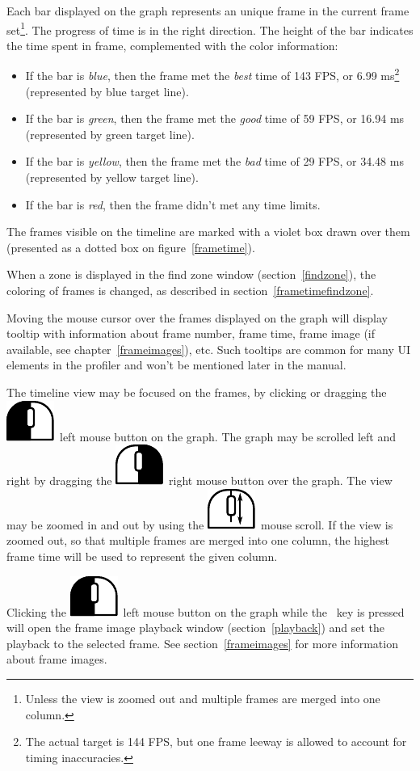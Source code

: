 \documentclass[hidelinks,titlepage,a4paper]{article}
\newcommand{\LMB}{\includegraphics[height=.8\baselineskip]{icons/lmb}}
\newcommand{\RMB}{\includegraphics[height=.8\baselineskip]{icons/rmb}}
\newcommand{\Scroll}{\includegraphics[height=.8\baselineskip]{icons/scroll}}
\begin{document}
Each bar displayed on the graph represents an unique frame in the current frame set\footnote{Unless the view is zoomed out and multiple frames are merged into one column.}. The progress of time is in the right direction. The height of the bar indicates the time spent in frame, complemented with the color information:

\begin{itemize}
\item If the bar is \emph{blue}, then the frame met the \emph{best} time of 143 FPS, or 6.99 \si{\milli\second}\footnote{The actual target is 144 FPS, but one frame leeway is allowed to account for timing inaccuracies.} (represented by blue target line).
\item If the bar is \emph{green}, then the frame met the \emph{good} time of 59 FPS, or 16.94 \si{\milli\second} (represented by green target line).
\item If the bar is \emph{yellow}, then the frame met the \emph{bad} time of 29 FPS, or 34.48 \si{\milli\second} (represented by yellow target line).
\item If the bar is \emph{red}, then the frame didn't met any time limits.
\end{itemize}

The frames visible on the timeline are marked with a violet box drawn over them (presented as a dotted box on figure~\ref{frametime}).

When a zone is displayed in the find zone window (section~\ref{findzone}), the coloring of frames is changed, as described in section~\ref{frametimefindzone}.

Moving the \faMousePointer{} mouse cursor over the frames displayed on the graph will display tooltip with information about frame number, frame time, frame image (if available, see chapter~\ref{frameimages}), etc. Such tooltips are common for many UI elements in the profiler and won't be mentioned later in the manual.

The timeline view may be focused on the frames, by clicking or dragging the \LMB{}~left mouse button on the graph. The graph may be scrolled left and right by dragging the \RMB{}~right mouse button over the graph. The view may be zoomed in and out by using the \Scroll{}~mouse scroll. If the view is zoomed out, so that multiple frames are merged into one column, the highest frame time will be used to represent the given column.

Clicking the \LMB{}~left mouse button on the graph while the \keys{\ctrl}~key is pressed will open the frame image playback window (section~\ref{playback}) and set the playback to the selected frame. See section~\ref{frameimages} for more information about frame images.
\end{document}
